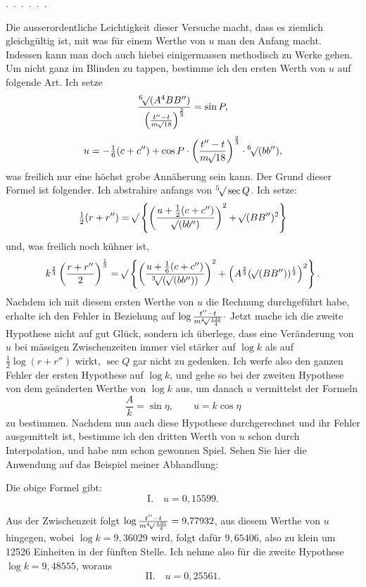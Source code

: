 \noindent\hspace*{\parindent}.\ .\ .\ .\ .\ .\par
Die ausserordentliche Leichtigkeit dieser Versuche macht, dass es ziemlich gleichgültig ist, mit was für einem Werthe von \(u\) man den Anfang macht. Indessen kann man doch auch hiebei einigermassen methodisch zu Werke gehen. Um nicht ganz im Blinden zu tappen, bestimme ich den ersten Werth von \(u\) auf folgende Art. Ich setze
\[
\frac{\BareRoot[6]{(A^4BB'')}}{\left(\frac{t''-t}{m\BareRoot{18}}\right)^{\frac23}}=\sin P,
\]
\[
u=-\tfrac16(c+c'')+\cos P\cdot\left(\frac{t''-t}{m\BareRoot{18}}\right)^{\frac23}\cdot\BareRoot[6]{(bb'')},
\]
was freilich nur eine höchst grobe Annäherung sein kann. Der Grund dieser Formel ist folgender. Ich abstrahire anfangs von \(\BareRoot[5]{\sec Q}\). Ich setze:
\[
\tfrac12(r+r'')=\BareRoot{\left\{\left(\frac{u+\frac12(c+c'')}{\BareRoot{(bb'')}}\right)^2+\BareRoot{(BB'')}^2\right\}}
\]
und, was freilich noch kühner ist,
\[
k^{\frac23}\left(\frac{r+r''}2\right)^{\frac13}=\BareRoot{\left\{\left(\frac{u+\frac16(c+c'')}{\BareRoot[3]{(\BareRoot{(bb'')})}}\right)^2+\left(A^{\frac23}(\BareRoot{(BB'')})^{\frac13}\right)^2\right\}}.
\]
Nachdem ich mit diesem ersten Werthe von \(u\) die Rechnung durchgeführt habe, erhalte ich den Fehler in Beziehung auf \(\log\frac{t''-t}{m\BareRoot[4]{\frac{135}4}}\mathpunct{\cdot}\) Jetzt mache ich die zweite Hypothese nicht auf gut Glück, sondern ich überlege, dass eine Veränderung von \(u\) bei mässigen Zwischenzeiten immer viel stärker auf \(\log k\) als auf \(\tfrac12\log(r+r'')\) wirkt, \(\sec Q\) gar nicht zu gedenken. Ich werfe also den ganzen Fehler der ersten Hypothese auf \(\log k\), und gehe so bei der zweiten Hypothese von dem geänderten Werthe von \(\log k\) aus, um danach \(u\) vermittelst der Formeln
\[
\frac Ak=\sin\eta,\qquad u=k\cos\eta
\]
zu bestimmen. Nachdem nun auch diese Hypothese durchgerechnet und ihr Fehler ausgemittelt ist, bestimme ich den dritten Werth von \(u\) schon durch Interpolation, und habe nun schon gewonnen Spiel. Sehen Sie hier die Anwendung auf das Beispiel meiner Abhandlung:

Die obige Formel gibt:
\[
\mathrm{I.}\quad u=0{,}15599.
\]

Aus der Zwischenzeit folgt \(\log\frac{t''-t}{m\BareRoot[4]{\frac{135}4}}=9{,}77932\), aus diesem Werthe von \(u\) hingegen, wobei \(\log k=9{,}36029\) wird, folgt dafür \(9{,}65406\), also zu klein um 12526 Einheiten in der fünften Stelle. Ich nehme also für die zweite Hypothese \(\log k=9{,}48555\), woraus
\[
\mathrm{II.}\quad u=0{,}25561.
\]

